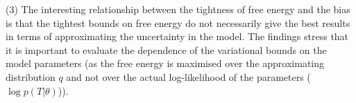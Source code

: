 \documentclass[twoside]{article}
\begin{document}
(3) The interesting relationship between the tightness of free energy and the bias is that the tightest bounds on free energy do not necessarily give the best results in terms of approximating the uncertainty in the model. The findings stress that it is important to evaluate the dependence of the variational bounds on the model parameters (as the free energy is maximised over the approximating distribution $q$ and not over the actual log-likelihood of the parameters ($\log p(T \vert \theta)$)).



\end{document}
